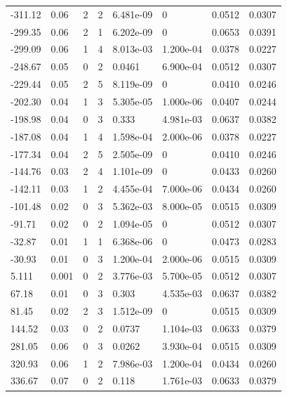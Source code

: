 \documentclass[preview]{standalone}
\begin{document}
{{\begin{tabular}{L{1.2cm}C{1.2cm} C{0.3cm}C{0.5cm} C{1.4cm}C{1.4cm} C{1.4cm}C{1.4cm}}
  -311.12  &  0.06  & 2     &  2 &  6.481e-09  & 0  & 0.0512 &  0.0307   \\ 
  -299.35  &  0.06  & 2     &  1 &  6.202e-09  & 0  & 0.0653 &  0.0391   \\ 
  -299.09  &  0.06  & 1     &  4 &  8.013e-03  & 1.200e-04  & 0.0378 &  0.0227   \\ 
  -248.67  &  0.05  & 0     &  2 &  0.0461  & 6.900e-04  & 0.0512 &  0.0307   \\ 
  -229.44  &  0.05  & 2     &  5 &  8.119e-09  & 0  & 0.0410 &  0.0246   \\ 
  -202.30  &  0.04  & 1     &  3 &  5.305e-05  & 1.000e-06  & 0.0407 &  0.0244   \\ 
  -198.98  &  0.04  & 0     &  3 &  0.333  & 4.981e-03  & 0.0637 &  0.0382   \\ 
  -187.08  &  0.04  & 1     &  4 &  1.598e-04  & 2.000e-06  & 0.0378 &  0.0227   \\ 
  -177.34  &  0.04  & 2     &  5 &  2.505e-09  & 0  & 0.0410 &  0.0246   \\ 
  -144.76  &  0.03  & 2     &  4 &  1.101e-09  & 0  & 0.0433 &  0.0260   \\ 
  -142.11  &  0.03  & 1     &  2 &  4.455e-04  & 7.000e-06  & 0.0434 &  0.0260   \\ 
  -101.48  &  0.02  & 0     &  3 &  5.362e-03  & 8.000e-05  & 0.0515 &  0.0309   \\ 
  -91.71  &  0.02  & 0     &  2 &  1.094e-05  & 0  & 0.0512 &  0.0307   \\ 
  -32.87  &  0.01  & 1     &  1 &  6.368e-06  & 0  & 0.0473 &  0.0283   \\ 
  -30.93  &  0.01  & 0     &  3 &  1.200e-04  & 2.000e-06  & 0.0515 &  0.0309   \\ 
  5.111  &  0.001  & 0     &  2 &  3.776e-03  & 5.700e-05  & 0.0512 &  0.0307   \\ 
  67.18  &  0.01  & 0     &  3 &  0.303  & 4.535e-03  & 0.0637 &  0.0382   \\ 
  81.45  &  0.02  & 2     &  3 &  1.512e-09  & 0  & 0.0515 &  0.0309   \\ 
  144.52  &  0.03  & 0     &  2 &  0.0737  & 1.104e-03  & 0.0633 &  0.0379   \\ 
  281.05  &  0.06  & 0     &  3 &  0.0262  & 3.930e-04  & 0.0515 &  0.0309   \\ 
  320.93  &  0.06  & 1     &  2 &  7.986e-03  & 1.200e-04  & 0.0434 &  0.0260   \\ 
  336.67  &  0.07  & 0     &  2 &  0.118  & 1.761e-03  & 0.0633 &  0.0379   \\ 

\end{tabular}}}
\end{document}
